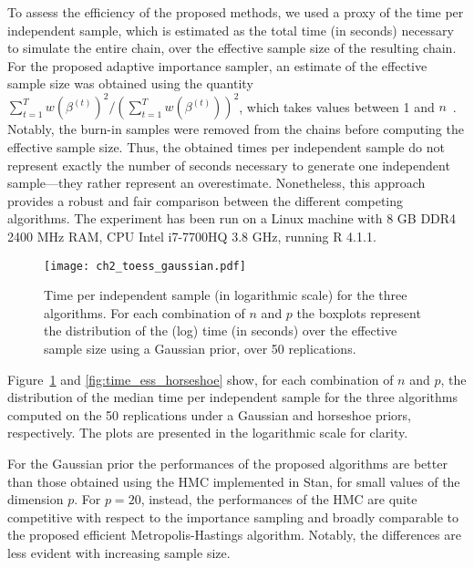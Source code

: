 To assess the efficiency of the proposed methods, we used a proxy of the time per independent sample, which is estimated as the total time (in seconds) necessary to simulate the entire chain, over the effective sample size of the resulting chain. For the proposed adaptive importance sampler, an estimate of the effective sample size was obtained using the quantity $\sum_{t=1}^T w(\beta^{(t)})^2 / (\sum_{t=1}^T w(\beta^{(t)}))^2$, which takes values between 1 and $n$~\citep{robert2010}. 
Notably, the burn-in samples were removed from the chains before computing the effective sample size. Thus, the obtained times per independent sample  do not represent exactly the number of seconds necessary to generate one independent sample---they rather represent an overestimate. Nonetheless, this approach provides a robust and fair comparison between the different competing algorithms. The experiment has been run on a Linux machine with 8 GB DDR4 2400 MHz RAM, CPU Intel i7-7700HQ 3.8 GHz, running R 4.1.1.
%
\begin{figure}[h]
	\begin{center}
		\texttt{[image: ch2\_toess\_gaussian.pdf]}
		\caption[Comparison between the time per independent sample of the proposed algorithms and of the HMC algorithm.]{Time per independent sample (in logarithmic scale) for the three algorithms. For each combination of $n$ and $p$ the boxplots represent the distribution of the (log) time (in seconds) over the effective sample size using a Gaussian prior, over 50 replications.
		\label{fig:time_ess}}
	\end{center}
\end{figure}

Figure~\ref{fig:time_ess} and \ref{fig:time_ess_horseshoe} show, for each combination of $n$ and $p$, the distribution of the median time per independent sample for the three algorithms computed on the 50 replications under a Gaussian and horseshoe priors, respectively. The plots are presented in the logarithmic scale for clarity. 

For the Gaussian prior the performances of the proposed algorithms are better than those obtained using the HMC implemented in Stan, for small values of the dimension $p$. For $p=20$, instead, the performances of the HMC are quite competitive with respect to the importance sampling and broadly comparable to the proposed efficient Metropolis-Hastings algorithm. Notably, the differences are less evident with increasing sample size. 

